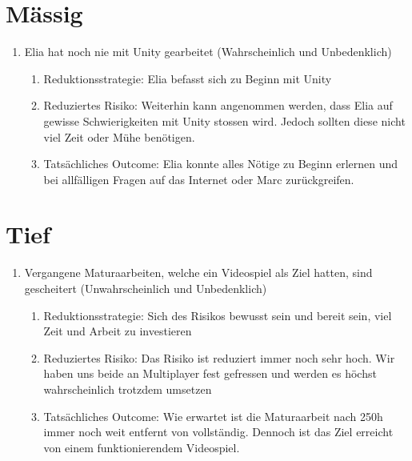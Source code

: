 \section{Mässig}
\begin{enumerate}
    \item Elia hat noch nie mit Unity gearbeitet (Wahrscheinlich und Unbedenklich)
    \begin{enumerate}
        \item Reduktionsstrategie: Elia befasst sich zu Beginn mit Unity
        \item Reduziertes Risiko: Weiterhin kann angenommen werden, dass Elia auf gewisse Schwierigkeiten mit Unity stossen wird.
              Jedoch sollten diese nicht viel Zeit oder Mühe benötigen. 
        \item Tatsächliches Outcome: Elia konnte alles Nötige zu Beginn erlernen und bei allfälligen Fragen auf das Internet oder Marc zurückgreifen.
    \end{enumerate}
\end{enumerate}

\section{Tief}
\begin{enumerate}
    \item Vergangene Maturaarbeiten, welche ein Videospiel als Ziel hatten, sind gescheitert (Unwahrscheinlich und Unbedenklich)
    \begin{enumerate}
        \item Reduktionsstrategie: Sich des Risikos bewusst sein und bereit sein, viel Zeit und Arbeit zu investieren
        \item Reduziertes Risiko: Das Risiko ist reduziert immer noch sehr hoch.
            Wir haben uns beide an Multiplayer fest gefressen und werden es höchst wahrscheinlich trotzdem umsetzen
        \item Tatsächliches Outcome: Wie erwartet ist die Maturaarbeit nach 250h immer noch weit entfernt von vollständig.
            Dennoch ist das Ziel erreicht von einem funktionierendem Videospiel.
    \end{enumerate}
\end{enumerate}